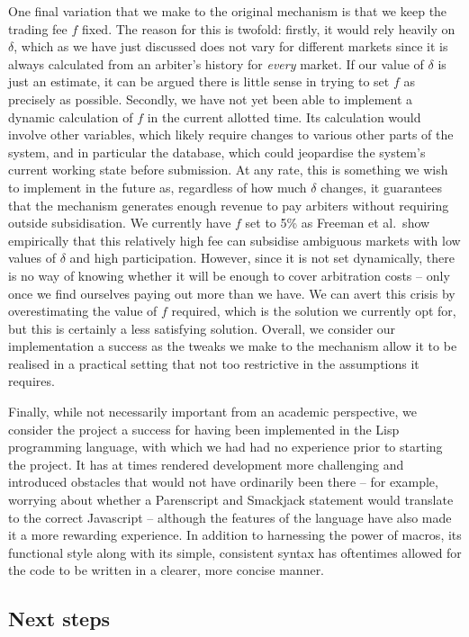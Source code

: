 One final variation that we make to the original mechanism is that we keep the
trading fee $f$ fixed. The reason for this is twofold: firstly, it would rely
heavily on $\delta$, which as we have just discussed does not vary for
different markets since it is always calculated from an arbiter's history for
\emph{every} market. If our value of $\delta$ is just an estimate, it can be
argued there is little sense in trying to set $f$ as precisely as possible.
Secondly, we have not yet been able to implement a dynamic calculation of $f$
in the current allotted time. Its calculation would involve other variables,
which likely require changes to various other parts of the system, and in
particular the database, which could jeopardise the system's current working
state before submission. At any rate, this is something we wish to implement in
the future as, regardless of how much $\delta$ changes, it guarantees that the
mechanism generates enough revenue to pay arbiters without requiring outside
subsidisation. We currently have $f$ set to 5\% as Freeman et al.\ show
empirically that this relatively high fee can subsidise ambiguous markets with
low values of $\delta$ and high participation. However, since it is not set
dynamically, there is no way of knowing whether it will be enough to cover
arbitration costs -- only once we find ourselves paying out more than we have.
We can avert this crisis by overestimating the value of $f$ required, which is
the solution we currently opt for, but this is certainly a less satisfying
solution. Overall, we consider our implementation a success as the tweaks we
make to the mechanism allow it to be realised in a practical setting that not
too restrictive in the assumptions it requires.

Finally, while not necessarily important from an academic perspective, we
consider the project a success for having been implemented in the Lisp
programming language, with which we had had no experience prior to starting the
project. It has at times rendered development more challenging and introduced
obstacles that would not have ordinarily been there -- for example, worrying
about whether a Parenscript and Smackjack statement would translate to the
correct Javascript -- although the features of the language have also made it a
more rewarding experience. In addition to harnessing the power of macros, its
functional style along with its simple, consistent syntax has oftentimes
allowed for the code to be written in a clearer, more concise manner.

\subsection{Next steps}

